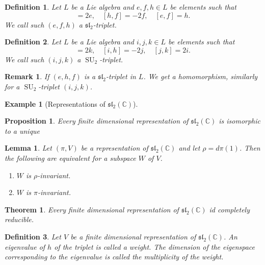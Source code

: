 \documentclass{article}
\newtheorem{theorem}{Theorem}[section]
\newtheorem{proposition}{Proposition}[section]
\newtheorem{definition}{Definition}[section]
\newtheorem{lemma}{Lemma}[section]
\newtheorem{remark}{Remark}[section]
\newtheorem{example}{Example}[section]
\numberwithin{equation}{section}
\DeclareMathOperator{\SU}{SU}
\begin{document}
\begin{definition}
Let $L$ be a Lie algebra and $e,f,h\in L$ be elements such that 
\begin{equation*}
[h,e]=2e,\quad[h,f]=-2f,\quad[e,f]=h.
\end{equation*}
We call such $(e,f,h)$ a $\mathfrak{sl}_2$-triplet.
\end{definition}

\begin{definition}
Let $L$ be a Lie algebra and $i,j,k\in L$ be elements such that 
\begin{equation*}
[i,j]=2k,\quad[i,h]=-2j,\quad[j,k]=2i.
\end{equation*}
We call such $(i,j,k)$ a $\SU_2$-triplet.
\end{definition}

\begin{remark}
If $(e,h,f)$ is a $\mathfrak{sl}_2$-triplet in $L$. We get a homomorphism, similarly for a $\SU_2$-triplet $(i,j,k)$.
\end{remark}

\begin{example}[Representations of $\mathfrak{sl}_2(\mathbb{C})$]
\end{example}

\begin{proposition}
Every finite dimensional representation of $\mathfrak{sl}_2(\mathbb{C})$ is isomorphic to a unique %
\end{proposition}

\begin{lemma}
Let $(\pi,V)$ be a representation of $\mathfrak{sl}_2(\mathbb{C})$ and let $\rho = d\pi(1)$. Then the following are equivalent for a subspace $W$ of $V$.
\begin{enumerate}
\item $W$ is $\rho$-invariant.
\item $W$ is $\pi$-invariant.
\end{enumerate}
\end{lemma}

\begin{theorem}
Every finite dimensional representation of $\mathfrak{sl}_2(\mathbb{C})$ id completely reducible.
\end{theorem}

\begin{definition}
Let $V$ be a finite dimensional representation of $\mathfrak{sl}_2(\mathbb{C})$. An eigenvalue of $h$ of the triplet is called a weight. The dimension of the eigenspace corresponding to the eigenvalue is called the multiplicity of the weight.
\end{definition}
\end{document}
